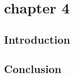 \chapter{chapter 4}
\label{chap:empirical-studies}

\section*{Introduction}
{}

\section*{Conclusion}
{}

